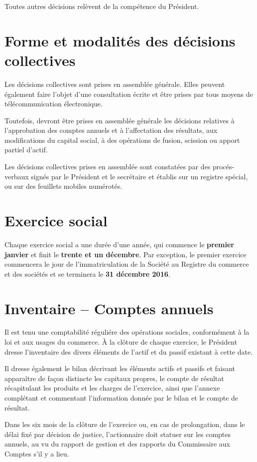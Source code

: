 \documentclass[a4paper,12pt]{report}
\begin{document}
Toutes autres décisions relèvent de la compétence du Président.

\section{Forme et modalités des décisions collectives}
Les décisions collectives sont prises en assemblée générale. 
Elles peuvent également faire l'objet d'une consultation écrite et être prises par tous moyens de télécommunication électronique.

Toutefois, devront être prises en assemblée générale les décisions relatives à l'approbation des comptes annuels et à l'affectation des résultats, 
aux modifications du capital social, à des opérations de fusion, scission ou apport partiel d'actif.

Les décisions collectives prises en assemblée sont constatées par des procés-verbaux signés par le Président et le secrétaire et établis sur un registre spécial, 
ou sur des feuillets mobiles numérotés.

\section{Exercice social}
Chaque exercice social a une durée d'une année, qui commence le \textbf{premier janvier} et finit le \textbf{trente et un décembre}. 
Par exception, le premier exercice commencera le jour de l'immatriculation de la Société au Registre du commerce et des sociétés et se terminera le \textbf{31 décembre 2016}.

\section{Inventaire -- Comptes annuels}

Il est tenu une comptabilité réguliére des opérations sociales, conformément à la loi et aux usages du commerce. 
À la clôture de chaque exercice, le Président dresse l'inventaire des divers éléments de l'actif et du passif existant à cette date.

Il dresse également le bilan décrivant les éléments actifs et passifs et faisant apparaître de façon distincte les capitaux propres, 
le compte de résultat récapitulant les produits et les charges de l'exercice, ainsi que l'annexe complétant et commentant l'information donnée par le bilan et le compte de résultat.

Dans les six mois de la clôture de l'exercice ou, en cas de prolongation, dans le délai fixé par décision de justice, l'actionnaire doit statuer sur les comptes annuels, 
au vu du rapport de gestion et des rapports du Commissaire aux Comptes s'il y a lieu.
\end{document}
